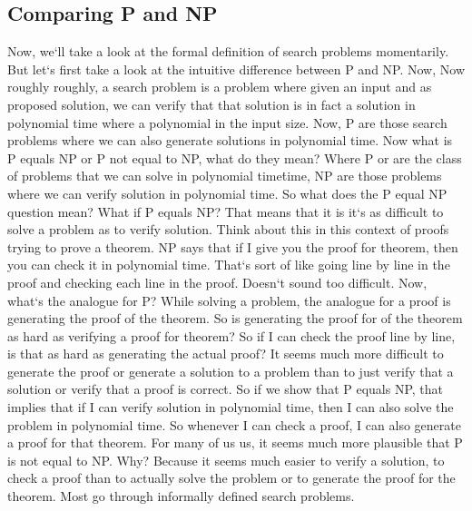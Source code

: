 \subsection{Comparing P and NP}
Now, we`ll take a look at the formal definition of search problems momentarily.
But let`s first take a look at the intuitive difference between P and NP\@.
Now, Now roughly roughly, a search problem is a problem where given an input and as proposed solution, we can verify that that solution is in fact a solution in polynomial time where a polynomial in the input size.
Now, P are those search problems where we can also generate solutions in polynomial time.
Now what is P equals NP or P not equal to NP, what do they mean? Where P or are the class of problems that we can solve in polynomial time\. time, NP are those problems where we can verify solution in polynomial time.
So what does the P equal NP question mean? What if P equals NP? That means that it is it`s as difficult to solve a problem as to verify solution.
Think about this in this context of proofs trying to prove a theorem.
NP says that if I give you the proof for theorem, then you can check it in polynomial time.
That`s sort of like going line by line in the proof and checking each line in the proof.
Doesn`t sound too difficult.
Now, what`s the analogue for P? While solving a problem, the analogue for a proof is generating the proof of the theorem.
So is generating the proof for of the theorem as hard as verifying a proof for theorem? So if I can check the proof line by line, is that as hard as generating the actual proof? It seems much more difficult to generate the proof or generate a solution to a problem than to just verify that a solution or verify that a proof is correct.
So if we show that P equals NP, that implies that if I can verify solution in polynomial time, then I can also solve the problem in polynomial time.
So whenever I can check a proof, I can also generate a proof for that theorem.
For many of us us, it seems much more plausible that P is not equal to NP\@.
Why? Because it seems much easier to verify a solution, to check a proof than to actually solve the problem or to generate the proof for the theorem.
Most go through informally defined search problems.

